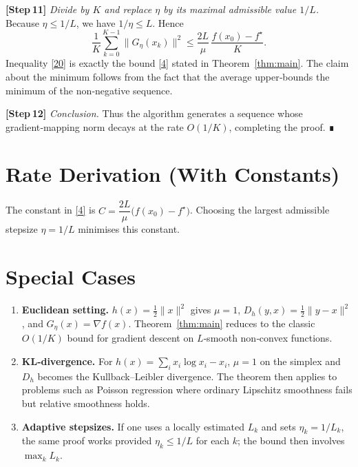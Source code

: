 \documentclass{article}
\newcommand{\grad}{\nabla}
\newcommand{\Breg}{D_{h}}
\begin{document}
\noindent\textbf{[Step 11]} \emph{Divide by $K$ and replace $\eta$ by its maximal admissible value $1/L$.}  
Because $\eta\le 1/L$, we have $1/\eta\le L$. Hence
\[
\frac{1}{K}\sum_{k=0}^{K-1}\|G_{\eta}(x_k)\|^{2}
   \le \frac{2L}{\mu}\,\frac{f(x_0)-f^\star}{K}.
\tag{20}
\]
Inequality \eqref{20} is exactly the bound \eqref{4} stated in Theorem~\ref{thm:main}. The claim about the minimum follows from the fact that the average upper‑bounds the minimum of the non‑negative sequence.

\noindent\textbf{[Step 12]} \emph{Conclusion.}  
Thus the algorithm generates a sequence whose gradient‑mapping norm decays at the rate $O(1/K)$, completing the proof. ∎

\section*{Rate Derivation (With Constants)}
The constant in \eqref{4} is $C=\dfrac{2L}{\mu}\bigl(f(x_0)-f^\star\bigr)$.  
Choosing the largest admissible stepsize $\eta=1/L$ minimises this constant.

\section*{Special Cases}
\begin{enumerate}
\item \textbf{Euclidean setting.} $h(x)=\tfrac12\|x\|^{2}$ gives $\mu=1$, $\Breg (y,x)=\tfrac12\|y-x\|^{2}$, and $G_{\eta}(x)=\grad f(x)$. Theorem~\ref{thm:main} reduces to the classic $O(1/K)$ bound for gradient descent on $L$‑smooth non‑convex functions.
\item \textbf{KL‑divergence.} For $h(x)=\sum_{i}x_i\log x_i -x_i$, $\mu=1$ on the simplex and $\Breg$ becomes the Kullback–Leibler divergence. The theorem then applies to problems such as Poisson regression where ordinary Lipschitz smoothness fails but relative smoothness holds.
\item \textbf{Adaptive stepsizes.} If one uses a locally estimated $L_k$ and sets $\eta_k=1/L_k$, the same proof works provided $\eta_k\le 1/L$ for each $k$; the bound then involves $\max_k L_k$.
\end{enumerate}
\end{document}
